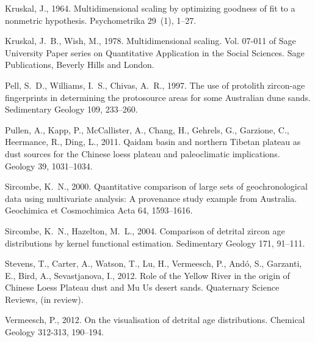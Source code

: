 \documentclass[authoryear,preprint,review,12pt]{elsarticle}
\begin{document}
\begin{thebibliography}{19}
Kruskal, J., 1964. Multidimensional scaling by optimizing goodness of fit to a
  nonmetric hypothesis. Psychometrika 29~(1), 1--27.

Kruskal, J.~B., Wish, M., 1978. Multidimensional scaling. Vol. 07-011 of Sage
  University Paper series on Quantitative Application in the Social Sciences.
  Sage Publications, Beverly Hills and London.

Pell, S.~D., Williams, I.~S., Chivas, A.~R., 1997. The use of protolith
  zircon-age fingerprints in determining the protosource areas for some
  {A}ustralian dune sands. Sedimentary Geology 109, 233--260.

Pullen, A., Kapp, P., McCallister, A., Chang, H., Gehrels, G., Garzione, C.,
  Heermance, R., Ding, L., 2011. Qaidam basin and northern Tibetan plateau as
  dust sources for the Chinese loess plateau and paleoclimatic implications.
  Geology 39, 1031--1034.

Sircombe, K.~N., 2000. Quantitative comparison of large sets of
  geochronological data using multivariate analysis: A provenance study example
  from {A}ustralia. Geochimica et Cosmochimica Acta 64, 1593--1616.

{Sircombe}, K.~N., {Hazelton}, M.~L., 2004. {Comparison of detrital zircon age
  distributions by kernel functional estimation}. Sedimentary Geology 171,
  91--111.

Stevens, T., Carter, A., Watson, T., Lu, H., Vermeesch, P., And\'{o}, S.,
  Garzanti, E., Bird, A., Sevastjanova, I., 2012. {Role of the Yellow River in
  the origin of Chinese Loess Plateau dust and Mu Us desert sands}. Quaternary
  Science Reviews, (in review).

Vermeesch, P., 2012. On the visualisation of detrital age distributions.
  Chemical Geology 312-313, 190--194.

\end{thebibliography}
\end{document}
